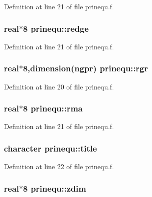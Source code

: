 Definition at line 21 of file prinequ.f.\hypertarget{namespaceprinequ_daccbb92c2237bfd27acd42cfc7a1753}{
\subsubsection[redge]{\setlength{\rightskip}{0pt plus 5cm}real$\ast$8 {\bf prinequ::redge}}}
\label{namespaceprinequ_daccbb92c2237bfd27acd42cfc7a1753}




Definition at line 21 of file prinequ.f.\hypertarget{namespaceprinequ_138b25820f0b9623a1ad87f0e82f7d8d}{
\subsubsection[rgr]{\setlength{\rightskip}{0pt plus 5cm}real$\ast$8,dimension(ngpr) {\bf prinequ::rgr}}}
\label{namespaceprinequ_138b25820f0b9623a1ad87f0e82f7d8d}




Definition at line 20 of file prinequ.f.\hypertarget{namespaceprinequ_9baaf20a81d9b0570388ae03719ea32e}{
\subsubsection[rma]{\setlength{\rightskip}{0pt plus 5cm}real$\ast$8 {\bf prinequ::rma}}}
\label{namespaceprinequ_9baaf20a81d9b0570388ae03719ea32e}




Definition at line 21 of file prinequ.f.\hypertarget{namespaceprinequ_c547b01609416ef885762a15c771e7fa}{
\subsubsection[title]{\setlength{\rightskip}{0pt plus 5cm}character {\bf prinequ::title}}}
\label{namespaceprinequ_c547b01609416ef885762a15c771e7fa}




Definition at line 22 of file prinequ.f.\hypertarget{namespaceprinequ_3a44d82c8ebf602b6048ebf656101a4b}{
\subsubsection[zdim]{\setlength{\rightskip}{0pt plus 5cm}real$\ast$8 {\bf prinequ::zdim}}}
\label{namespaceprinequ_3a44d82c8ebf602b6048ebf656101a4b}





